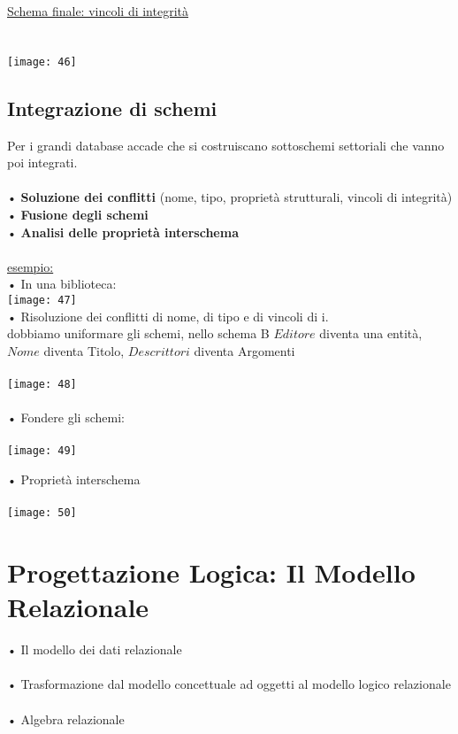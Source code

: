 \documentclass[12pt, letterpaper]{article}
\begin{document}
\newpage

\underline{Schema finale: vincoli di integrità}
\\
\\
\\
\texttt{[image: 46]}

\subsection{Integrazione di schemi}

Per i grandi database accade che si costruiscano sottoschemi settoriali che vanno 
poi integrati.
\\
\\
• \textbf{Soluzione dei conflitti} (nome, tipo, proprietà strutturali, vincoli di integrità)\\
• \textbf{Fusione degli schemi}\\
• \textbf{Analisi delle proprietà interschema}
\\
\\
\underline{esempio:}
\\
• In una biblioteca:
\\
\texttt{[image: 47]}
\\
• Risoluzione dei conflitti di nome, di tipo e di vincoli di i.
\\
dobbiamo uniformare gli schemi, nello schema B $Editore$ diventa una entità, $Nome$ diventa Titolo, $Descrittori$ diventa Argomenti
\\
\\
\texttt{[image: 48]}
\\
\\
• Fondere gli schemi:
\\
\\
\texttt{[image: 49]}

\newpage

• Proprietà interschema 
\\
\\
\texttt{[image: 50]}

\section{Progettazione Logica: Il Modello Relazionale}

• Il modello dei dati relazionale
\\
\\
• Trasformazione dal modello concettuale ad oggetti al modello logico
relazionale
\\
\\
• Algebra relazionale
\end{document}
